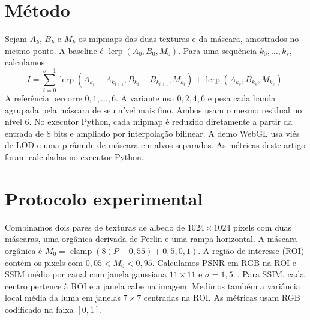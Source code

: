 \documentclass[11pt,a4paper]{article}
\begin{document}
\section{Método}
Sejam \(A_k\), \(B_k\) e \(M_k\) os mipmaps das duas texturas e da máscara, amostrados no mesmo ponto. A baseline é \(\operatorname{lerp}(A_0,B_0,M_0)\). Para uma sequência \(k_0,\ldots,k_s\), calculamos
\begin{equation}
  I = \sum_{i=0}^{s-1} \operatorname{lerp}(A_{k_i}-A_{k_{i+1}},
      B_{k_i}-B_{k_{i+1}}, M_{k_i}) + \operatorname{lerp}(A_{k_s},B_{k_s},M_{k_s}).
\end{equation}
A referência percorre \(0,1,\ldots,6\). A variante usa \(0,2,4,6\) e pesa cada banda agrupada pela máscara de seu nível mais fino. Ambos usam o mesmo residual no nível 6. No executor Python, cada mipmap é reduzido diretamente a partir da entrada de 8 bits e ampliado por interpolação bilinear. A demo WebGL usa viés de LOD e uma pirâmide de máscara em alvos separados. As métricas deste artigo foram calculadas no executor Python.

\section{Protocolo experimental}
Combinamos dois pares de texturas de albedo de \(1024\times1024\) pixels com duas máscaras, uma orgânica derivada de Perlin e uma rampa horizontal. A máscara orgânica é \(M_0=\operatorname{clamp}(8(P-0{,}55)+0{,}5,0,1)\). A região de interesse (ROI) contém os pixels com \(0{,}05<M_0<0{,}95\). Calculamos PSNR em RGB na ROI e SSIM médio por canal com janela gaussiana \(11\times11\) e \(\sigma=1{,}5\)~\cite{wang2004}. Para SSIM, cada centro pertence à ROI e a janela cabe na imagem. Medimos também a variância local média da luma em janelas \(7\times7\) centradas na ROI. As métricas usam RGB codificado na faixa \([0,1]\).
\end{document}
